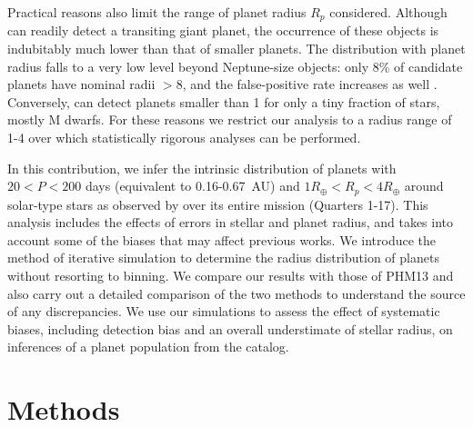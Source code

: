 Practical reasons also limit the range of planet radius $R_p$
considered.  Although \kep{} can readily detect a transiting giant
planet, the occurrence of these objects is indubitably much lower than
that of smaller planets.  The distribution with planet radius falls to
a very low level beyond Neptune-size objects: only 8\% of \kep{}
candidate planets have nominal radii $>8$\rearth{}, and the
false-positive rate increases as well \citep{Santerne2012,Colon2012}.
Conversely, \kep{} can detect planets smaller than 1\rearth{} for only
a tiny fraction of stars, mostly M dwarfs.  For these reasons we
restrict our analysis to a radius range of 1-4\rearth{} over which
statistically rigorous analyses can be performed. 

In this contribution, we infer the intrinsic distribution of planets
with $20<P<200$ days (equivalent to 0.16-0.67~AU) and
$1 R_\oplus < R_p < 4R_\oplus$ around solar-type stars as
observed by \kep{} over
its entire mission (Quarters 1-17).  This analysis includes the
effects of errors in stellar and planet radius, and takes into account
some of the biases that may affect previous works.  We introduce the
method of iterative simulation to determine the radius distribution of
planets without resorting to binning.  We compare our results with
those of PHM13 and also carry out a detailed comparison of the two
methods to understand the source of any discrepancies.  We use our
simulations to assess the effect of systematic biases, including
detection bias and an overall understimate of stellar radius, on
inferences of a planet population from the \kep{} catalog.

\section{Methods}
\label{sec:methods}
